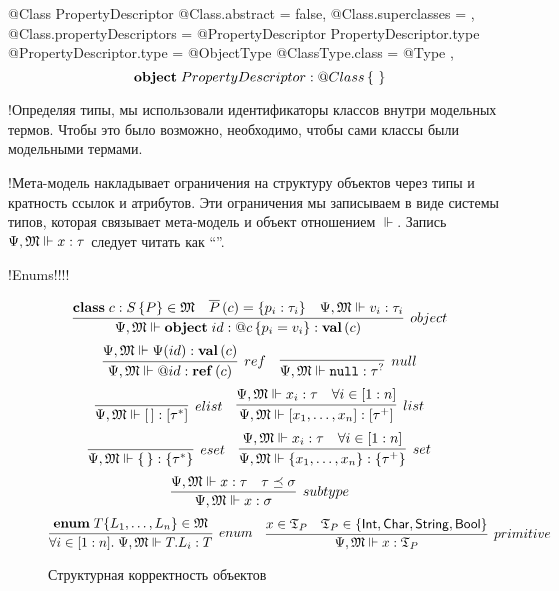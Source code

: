   @Class PropertyDescriptor {
    @Class.abstract = false,
    @Class.superclasses = {},
    @Class.propertyDescriptors = {
      @PropertyDescriptor PropertyDescriptor.type {
        @PropertyDescriptor.type = @ObjectType { @ClassType.class = @Type }
      }
    }
  },
$$
\mathbf{object}\;PropertyDescriptor : @Class\left\{ \mbox{
} \right\}
$$

!Определяя типы, мы использовали идентификаторы классов внутри модельных термов. Чтобы это было возможно, необходимо, чтобы сами классы были модельными термами.

!Мета-модель накладывает ограничения на структуру объектов через типы и кратность ссылок и атрибутов. Эти ограничения мы записываем в виде системы типов, которая связывает мета-модель и объект отношением $\Vdash$. Запись $\Psi, \mathfrak{M} \Vdash x : \tau$ следует читать как ``''.

!Enums!!!!

\begin{figure}[htbp]
	\centering
$$
	\infer[object]{
		\fromMM \Object{id}{\Ref{c}}{p_i = v_i} : \ClassT{c}
	}{
		\Class{c}{S}{P} \in \MM{M}&
		\AllProps{c} = \{p_i : \tau_i\}&
		\fromMM v_i : \tau_i
	}
$$
$$
\infer[ref]{
	\fromMM \Ref{id} : \RefT{c}
}{
	\fromMM \RContext(id) : \ClassT{c}
}
\quad
\infer[null]{
	\fromMM \Null : \NullableT{\tau}
}{}
$$
$$
\infer[elist]{
	\fromMM \List{\,} : \ListT{\tau^*}
}{}
\quad
\infer[list]{
	\fromMM \List{x_1, \ldots, x_n} : \List{\tau^+}
}{
	\fromMM x_i : \tau & \forall i\in[1:n]
}
$$
$$
\infer[eset]{
	\fromMM \Set{\,} : \SetT{\tau^*}
}{}
\quad
\infer[set]{
	\fromMM \Set{x_1, \ldots, x_n} : \SetT{\tau^+}
}{
	\fromMM x_i : \tau & \forall i\in[1:n]
}
$$
$$
\infer[subtype]{
	\fromMM x : \sigma
}{
	\fromMM x : \tau &
	\tau \subtype \sigma
}
$$
$$
\infer[enum]{
	\forall i \in [1:n]. \; \fromMM T.L_i : T
}{
	\mathbf{enum}\;T\{L_1,\ldots,L_n\} \in \MM{M}
}
\quad
\infer[primitive]{
	\fromMM x : \Types_P
}{
	x \in \Types_P & 
	\Types_P \in \{\IntegerT, \CharT, \StringT, \BooleanT\}
}
$$
	\caption{Структурная корректность объектов}\label{TypesMM}
\end{figure}


